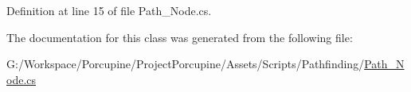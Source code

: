 Definition at line 15 of file Path\+\_\+\+Node.\+cs.



The documentation for this class was generated from the following file\+:\begin{DoxyCompactItemize}
\item 
G\+:/\+Workspace/\+Porcupine/\+Project\+Porcupine/\+Assets/\+Scripts/\+Pathfinding/\hyperlink{_path___node_8cs}{Path\+\_\+\+Node.\+cs}\end{DoxyCompactItemize}
